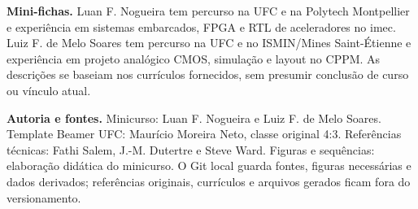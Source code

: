 \documentclass[11pt,a4paper]{article}
\begin{document}
\textbf{Mini-fichas.} Luan F. Nogueira tem percurso na UFC e na Polytech Montpellier e experiência em sistemas embarcados, FPGA e RTL de aceleradores no imec. Luiz F. de Melo Soares tem percurso na UFC e no ISMIN/Mines Saint-Étienne e experiência em projeto analógico CMOS, simulação e layout no CPPM. As descrições se baseiam nos currículos fornecidos, sem presumir conclusão de curso ou vínculo atual.

\textbf{Autoria e fontes.} Minicurso: Luan F. Nogueira e Luiz F. de Melo Soares. Template Beamer UFC: Maurício Moreira Neto, classe original 4:3. Referências técnicas: Fathi Salem, J.-M. Dutertre e Steve Ward. Figuras e sequências: elaboração didática do minicurso. O Git local guarda fontes, figuras necessárias e dados derivados; referências originais, currículos e arquivos gerados ficam fora do versionamento.
\end{document}
